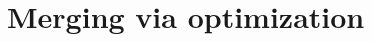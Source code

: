 \documentclass[thesis.tex]{subfiles}
\begin{document}
\chapter{Merging via optimization}
\end{document}
